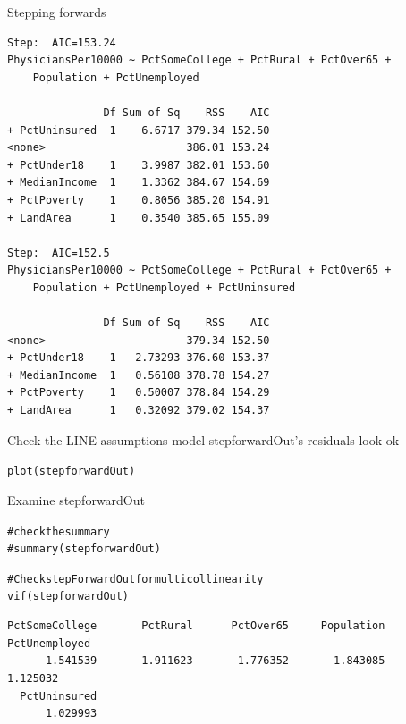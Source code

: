 \documentclass{beamer}\usepackage[]{graphicx}\usepackage[]{color}
\makeatletter
\newcommand{\hlcom}[1]{\textcolor[rgb]{0.824,0.706,0.549}{#1}}%
\newcommand{\hlstd}[1]{\textcolor[rgb]{1,0.894,0.769}{#1}}%
\newcommand{\hlkwd}[1]{\textcolor[rgb]{1,0.78,0.769}{#1}}%
\newenvironment{kframe}{%
 \def\at@end@of@kframe{}%
 \ifinner\ifhmode%
  \def\at@end@of@kframe{\end{minipage}}%
  \begin{minipage}{\columnwidth}%
 \fi\fi%
 \def\FrameCommand##1{\hskip\@totalleftmargin \hskip-\fboxsep
 \colorbox{shadecolor}{##1}\hskip-\fboxsep
     \hskip-\linewidth \hskip-\@totalleftmargin \hskip\columnwidth}%
 \MakeFramed {\advance\hsize-\width
   \@totalleftmargin\z@ \linewidth\hsize
   \@setminipage}}%
 {\par\unskip\endMakeFramed%
 \at@end@of@kframe}
\newenvironment{knitrout}{}{} %
\makeatother
\begin{document}
\begin{darkframes}
\begin{frame}[fragile]{Stepping forwards}
\begin{knitrout}
\begin{kframe}
\begin{verbatim}
Step:  AIC=153.24
PhysiciansPer10000 ~ PctSomeCollege + PctRural + PctOver65 + 
    Population + PctUnemployed

               Df Sum of Sq    RSS    AIC
+ PctUninsured  1    6.6717 379.34 152.50
<none>                      386.01 153.24
+ PctUnder18    1    3.9987 382.01 153.60
+ MedianIncome  1    1.3362 384.67 154.69
+ PctPoverty    1    0.8056 385.20 154.91
+ LandArea      1    0.3540 385.65 155.09

Step:  AIC=152.5
PhysiciansPer10000 ~ PctSomeCollege + PctRural + PctOver65 + 
    Population + PctUnemployed + PctUninsured

               Df Sum of Sq    RSS    AIC
<none>                      379.34 152.50
+ PctUnder18    1   2.73293 376.60 153.37
+ MedianIncome  1   0.56108 378.78 154.27
+ PctPoverty    1   0.50007 378.84 154.29
+ LandArea      1   0.32092 379.02 154.37
\end{verbatim}
\end{kframe}
\end{knitrout}

      \lc %
    \end{frame}

  
    \begin{frame}[fragile]{Check the LINE assumptions}
      model stepforwardOut's residuals look ok
      \fontsize{8}{8}\selectfont

\begin{knitrout}
\begin{kframe}
\begin{alltt}
\hlkwd{plot}\hlstd{(stepforwardOut)}
\end{alltt}
\end{kframe}


\end{knitrout}

    \end{frame}


    \begin{frame}[fragile]{Examine stepforwardOut}
    \fontsize{8}{8}\selectfont
\begin{knitrout}
\begin{kframe}
\begin{alltt}
\hlcom{# check the summary}
\hlcom{#summary(stepforwardOut)}

\hlcom{# Check stepForwardOut for multicollinearity}
\hlkwd{vif}\hlstd{(stepforwardOut)}
\end{alltt}
\begin{verbatim}
PctSomeCollege       PctRural      PctOver65     Population  PctUnemployed 
      1.541539       1.911623       1.776352       1.843085       1.125032 
  PctUninsured 
      1.029993 
\end{verbatim}
\end{kframe}
\end{knitrout}


\end{frame}
\end{darkframes}
\end{document}
